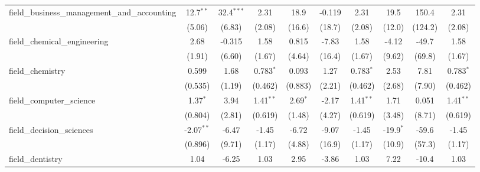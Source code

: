 \begin{tabular}{lccccccccc}
   field\_business\_management\_and\_accounting                & 12.7$^{**}$    & 32.4$^{***}$  & 2.31           & 18.9           & -0.119       & 2.31           & 19.5          & 150.4         & 2.31\\   
                                                               & (5.06)         & (6.83)        & (2.08)         & (16.6)         & (18.7)       & (2.08)         & (12.0)        & (124.2)       & (2.08)\\   
   field\_chemical\_engineering                                & 2.68           & -0.315        & 1.58           & 0.815          & -7.83        & 1.58           & -4.12         & -49.7         & 1.58\\   
                                                               & (1.91)         & (6.60)        & (1.67)         & (4.64)         & (16.4)       & (1.67)         & (9.62)        & (69.8)        & (1.67)\\   
   field\_chemistry                                            & 0.599          & 1.68          & 0.783$^{*}$    & 0.093          & 1.27         & 0.783$^{*}$    & 2.53          & 7.81          & 0.783$^{*}$\\   
                                                               & (0.535)        & (1.19)        & (0.462)        & (0.883)        & (2.21)       & (0.462)        & (2.68)        & (7.90)        & (0.462)\\   
   field\_computer\_science                                    & 1.37$^{*}$     & 3.94          & 1.41$^{**}$    & 2.69$^{*}$     & -2.17        & 1.41$^{**}$    & 1.71          & 0.051         & 1.41$^{**}$\\   
                                                               & (0.804)        & (2.81)        & (0.619)        & (1.48)         & (4.27)       & (0.619)        & (3.48)        & (8.71)        & (0.619)\\   
   field\_decision\_sciences                                   & -2.07$^{**}$   & -6.47         & -1.45          & -6.72          & -9.07        & -1.45          & -19.9$^{*}$   & -59.6         & -1.45\\   
                                                               & (0.896)        & (9.71)        & (1.17)         & (4.88)         & (16.9)       & (1.17)         & (10.9)        & (57.3)        & (1.17)\\   
   field\_dentistry                                            & 1.04           & -6.25         & 1.03           & 2.95           & -3.86        & 1.03           & 7.22          & -10.4         & 1.03\\   

\end{tabular}
